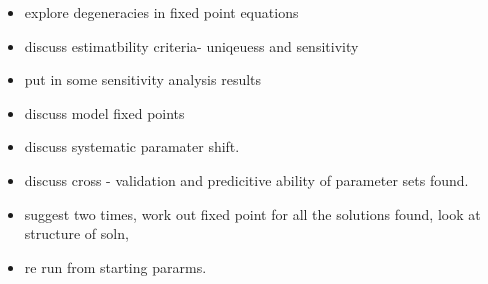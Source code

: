 \documentclass[10pt,journal]{./IEEE_latex_class/IEEEtran}
\begin{document}
  \begin{itemize}
 \item explore degeneracies in fixed point equations
 \item discuss estimatbility criteria- uniqeuess and sensitivity
 \item put in some sensitivity analysis results
 \item discuss model fixed points
 \item discuss systematic paramater shift.
 \item discuss cross - validation and predicitive ability of parameter sets found.
 \item suggest two times, work out fixed point for all the solutions found, look at structure of soln,
 \item re run from starting pararms.
 \end{itemize}
\end{document}

